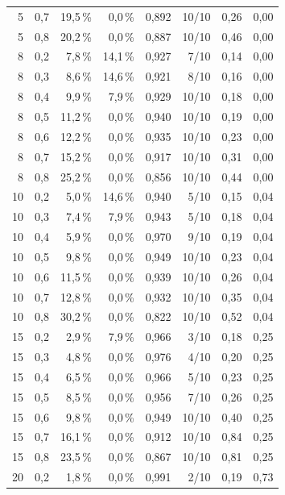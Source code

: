 \begin{table}[H]
\begin{tabular}{rrrrrrrr}
        5 & 0,7 & 19,5\,\% & 0,0\,\% & 0,892 & 10/10 & 0,26 & 0,00 \\
        5 & 0,8 & 20,2\,\% & 0,0\,\% & 0,887 & 10/10 & 0,46 & 0,00 \\
        \midrule
        8 & 0,2 & 7,8\,\% & 14,1\,\% & 0,927 & 7/10 & 0,14 & 0,00 \\
        8 & 0,3 & 8,6\,\% & 14,6\,\% & 0,921 & 8/10 & 0,16 & 0,00 \\
        8 & 0,4 & 9,9\,\% & 7,9\,\% & 0,929 & 10/10 & 0,18 & 0,00 \\
        8 & 0,5 & 11,2\,\% & 0,0\,\% & 0,940 & 10/10 & 0,19 & 0,00 \\
        8 & 0,6 & 12,2\,\% & 0,0\,\% & 0,935 & 10/10 & 0,23 & 0,00 \\
        8 & 0,7 & 15,2\,\% & 0,0\,\% & 0,917 & 10/10 & 0,31 & 0,00 \\
        8 & 0,8 & 25,2\,\% & 0,0\,\% & 0,856 & 10/10 & 0,44 & 0,00 \\
        \midrule
        10 & 0,2 & 5,0\,\% & 14,6\,\% & 0,940 & 5/10 & 0,15 & 0,04 \\
        10 & 0,3 & 7,4\,\% & 7,9\,\% & 0,943 & 5/10 & 0,18 & 0,04 \\
        10 & 0,4 & 5,9\,\% & 0,0\,\% & 0,970 & 9/10 & 0,19 & 0,04 \\
        10 & 0,5 & 9,8\,\% & 0,0\,\% & 0,949 & 10/10 & 0,23 & 0,04 \\
        10 & 0,6 & 11,5\,\% & 0,0\,\% & 0,939 & 10/10 & 0,26 & 0,04 \\
        10 & 0,7 & 12,8\,\% & 0,0\,\% & 0,932 & 10/10 & 0,35 & 0,04 \\
        10 & 0,8 & 30,2\,\% & 0,0\,\% & 0,822 & 10/10 & 0,52 & 0,04 \\
        \midrule
        15 & 0,2 & 2,9\,\% & 7,9\,\% & 0,966 & 3/10 & 0,18 & 0,25 \\
        15 & 0,3 & 4,8\,\% & 0,0\,\% & 0,976 & 4/10 & 0,20 & 0,25 \\
        15 & 0,4 & 6,5\,\% & 0,0\,\% & 0,966 & 5/10 & 0,23 & 0,25 \\
        15 & 0,5 & 8,5\,\% & 0,0\,\% & 0,956 & 7/10 & 0,26 & 0,25 \\
        15 & 0,6 & 9,8\,\% & 0,0\,\% & 0,949 & 10/10 & 0,40 & 0,25 \\
        15 & 0,7 & 16,1\,\% & 0,0\,\% & 0,912 & 10/10 & 0,84 & 0,25 \\
        15 & 0,8 & 23,5\,\% & 0,0\,\% & 0,867 & 10/10 & 0,81 & 0,25 \\
        \midrule
        20 & 0,2 & 1,8\,\% & 0,0\,\% & 0,991 & 2/10 & 0,19 & 0,73 \\

\end{tabular}
\end{table}
